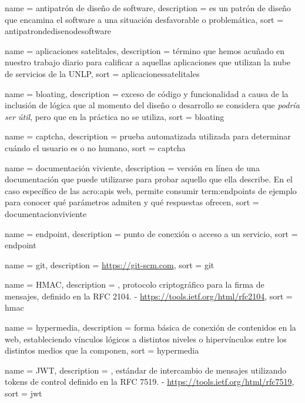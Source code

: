\newpage
{} {
  name = {antipatrón de diseño de software},
  description = {es un patrón de diseño que encamina el software a una situación desfavorable o problemática},
  sort = {antipatrondedisenodesoftware}
}

 {
  name = {aplicaciones satelitales},
  description = {término que hemos acuñado en nuestro trabajo diario para calificar a aquellas aplicaciones que utilizan la nube de servicios de la UNLP},
  sort = {aplicacionessatelitales}
}

 {
  name = {bloating},
  description = {exceso de código y funcionalidad a causa de la inclusión de lógica que al momento del diseño o desarrollo se considera que \textit{podría ser útil}, pero que en la práctica no se utiliza},
  sort = {bloating}
}

 {
  name = {captcha},
  description = {prueba automatizada utilizada para determinar cuándo el usuario es o no humano},
  sort = {captcha}
}

 {
  name = {documentación viviente},
  description = {versión en línea de una documentación que puede utilizarse para probar aquello que ella describe. En el caso específico de las \glspl{acro:api} web, permite consumir \glspl{term:endpoint} de ejemplo para conocer qué parámetros admiten y qué respuestas ofrecen},
  sort = {documentacionviviente}
}

 {
  name = {endpoint},
  description = {punto de conexión o acceso a un servicio},
  sort = {endpoint}
}

 {
  name = {git},
  description = {\url{https://git-scm.com}},
  sort = {git}
}

 {
  name = {HMAC},
  description = {, protocolo criptográfico para la firma de mensajes, definido en la RFC 2104. - \url{https://tools.ietf.org/html/rfc2104}},
  sort = {hmac}
}

 {
  name = {hypermedia},
  description = {forma básica de conexión de contenidos en la web, estableciendo vínculos lógicos a distintos niveles o hipervínculos entre los distintos medios que la componen},
  sort = {hypermedia}
}

 {
  name = {JWT},
  description = {, estándar de intercambio de mensajes utilizando tokens de control definido en la RFC 7519. - \url{https://tools.ietf.org/html/rfc7519}},
  sort = {jwt}
}

